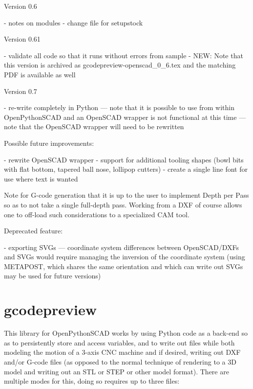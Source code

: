 \documentclass{ltxdoc}
\begin{document}
\begin{readme}
Version 0.6

 - notes on modules
 - change file for setupstock

Version 0.61

 - validate all code so that it runs without errors from sample
 - NEW: Note that this version is archived as gcodepreview-openscad_0_6.tex and the matching PDF is available as well
 
 Version 0.7
 
  - re-write completely in Python --- note that it is possible to use from within OpenPythonSCAD and an OpenSCAD wrapper is not functional at this time --- note that the OpenSCAD wrapper will need to be rewritten

Possible future improvements:

 - rewrite OpenSCAD wrapper
 - support for additional tooling shapes (bowl bits with flat bottom, tapered ball nose, lollipop cutters)
 - create a single line font for use where text is wanted

Note for G-code generation that it is up to the user to implement Depth per Pass so as to not take a single full-depth pass. Working from a DXF of course allows one to off-load such considerations to a specialized CAM tool.

Deprecated feature:

 - exporting SVGs --- coordinate system differences between OpenSCAD/DXFs and SVGs would require managing the inversion of the coordinate system (using METAPOST, which shares the same orientation and which can write out SVGs may be used for future versions)

\end{readme}

\clearpage
\section{gcodepreview}

This library for OpenPythonSCAD works by using Python code as a back-end so as to persistently store and access variables, and to write out files while both modeling the motion of a 3-axis CNC machine and if desired, writing out DXF and/or G-code files (as opposed to the normal technique of rendering to a 3D model and writing out an STL or STEP or other model format). There are multiple modes for this, doing so requires up to three files:
\end{document}
